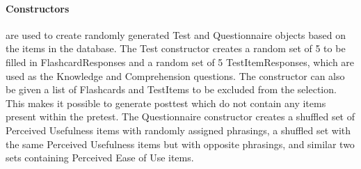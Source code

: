 \paragraph{Constructors} are used to create randomly generated Test and Questionnaire objects based on the items in the database. The Test constructor creates a random set of 5 to be filled in FlashcardResponses and a random set of 5 TestItemResponses, which are used as the Knowledge and Comprehension questions. The constructor can also be given a list of Flashcards and TestItems to be excluded from the selection. This makes it possible to generate posttest which do not contain any items present within the pretest. The Questionnaire constructor creates a shuffled set of Perceived Usefulness items with randomly assigned phrasings, a shuffled set with the same Perceived Usefulness items but with opposite phrasings, and similar two sets containing Perceived Ease of Use items.

